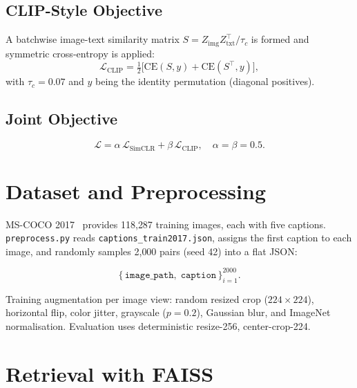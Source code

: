 \documentclass[conference]{IEEEtran}
\begin{document}
\subsection{CLIP-Style Objective}
A batchwise image-text similarity matrix
$S = Z_{\text{img}}Z_{\text{txt}}^\top / \tau_c$ is formed and
symmetric cross-entropy is applied:
\begin{equation}
  \mathcal{L}_{\text{CLIP}} = \tfrac{1}{2}
  \bigl[\mathrm{CE}(S,y) + \mathrm{CE}(S^\top,y)\bigr],
\end{equation}
with $\tau_c = 0.07$ and $y$ being the identity permutation (diagonal positives).

\subsection{Joint Objective}
\begin{equation}
  \mathcal{L} = \alpha\,\mathcal{L}_{\text{SimCLR}} +
                \beta\,\mathcal{L}_{\text{CLIP}},
  \quad \alpha=\beta=0.5.
  \label{eq:joint}
\end{equation}

\section{Dataset and Preprocessing}
MS-COCO 2017~\cite{coco} provides 118{,}287 training images, each
with five captions.
\texttt{preprocess.py} reads \texttt{captions\_train2017.json},
assigns the first caption to each image, and randomly samples 2{,}000
pairs (seed 42) into a flat JSON:

\begin{equation*}
  \bigl\{\,\texttt{image\_path},\;\texttt{caption}\,\bigr\}_{i=1}^{2000}.
\end{equation*}

Training augmentation per image view:
random resized crop ($224\times224$), horizontal flip,
color jitter, grayscale ($p{=}0.2$), Gaussian blur, and ImageNet normalisation.
Evaluation uses deterministic resize-256, center-crop-224.

\section{Retrieval with FAISS}
\end{document}
